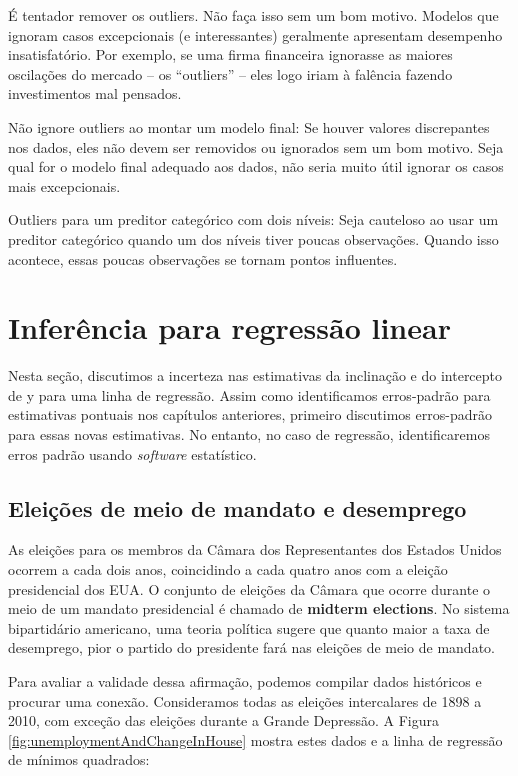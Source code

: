 \documentclass[
]{book}
\theoremstyle{definition}
\theoremstyle{definition}
\theoremstyle{definition}
\theoremstyle{definition}
\theoremstyle{remark}
\begin{document}
É tentador remover os outliers. Não faça isso sem um bom motivo. Modelos que ignoram casos excepcionais (e interessantes) geralmente apresentam desempenho insatisfatório. Por exemplo, se uma firma financeira ignorasse as maiores oscilações do mercado -- os ``outliers'' -- eles logo iriam à falência fazendo investimentos mal pensados.

Não ignore outliers ao montar um modelo final: Se houver valores discrepantes nos dados, eles não devem ser removidos ou ignorados sem um bom motivo. Seja qual for o modelo final adequado aos dados, não seria muito útil ignorar os casos mais excepcionais.

Outliers para um preditor categórico com dois níveis: Seja cauteloso ao usar um preditor categórico quando um dos níveis tiver poucas observações. Quando isso acontece, essas poucas observações se tornam pontos influentes.

\hypertarget{inferenceForLinearRegression}{%
\section{Inferência para regressão linear}\label{inferenceForLinearRegression}}

Nesta seção, discutimos a incerteza nas estimativas da inclinação e do intercepto de y para uma linha de regressão. Assim como identificamos erros-padrão para estimativas pontuais nos capítulos anteriores, primeiro discutimos erros-padrão para essas novas estimativas. No entanto, no caso de regressão, identificaremos erros padrão usando \emph{software} estatístico.

\hypertarget{halftermElectionsUnemployment}{%
\subsection{Eleições de meio de mandato e desemprego}\label{halftermElectionsUnemployment}}

As eleições para os membros da Câmara dos Representantes dos Estados Unidos ocorrem a cada dois anos, coincidindo a cada quatro anos com a eleição presidencial dos EUA. O conjunto de eleições da Câmara que ocorre durante o meio de um mandato presidencial é chamado de \textbf{midterm elections}. No sistema bipartidário americano, uma teoria política sugere que quanto maior a taxa de desemprego, pior o partido do presidente fará nas eleições de meio de mandato.

Para avaliar a validade dessa afirmação, podemos compilar dados históricos e procurar uma conexão. Consideramos todas as eleições intercalares de 1898 a 2010, com exceção das eleições durante a Grande Depressão. A Figura \ref{fig:unemploymentAndChangeInHouse} mostra estes dados e a linha de regressão de mínimos quadrados:
\end{document}
